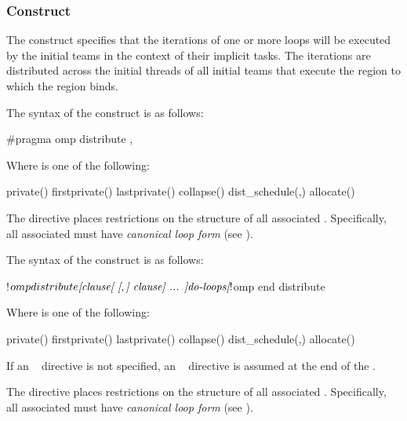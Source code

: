 \subsubsection{ Construct}
\label{subsec:distribute Construct}
\summary
The  construct specifies that the iterations of one or 
more loops will be executed by the initial teams in the context of their 
implicit tasks. The iterations are distributed across the initial threads 
of all initial teams that execute the  region to which the 
 region binds.

\syntax
\begin{ccppspecific}
The syntax of the  construct is as follows:

\begin{ompcPragma}
#pragma omp distribute \plc{[clause[ [},\plc{] clause] ... ] new-line}
\end{ompcPragma}

Where  is one of the following:

\begin{indentedcodelist}
private()
firstprivate()
lastprivate()
collapse()
dist_schedule(\plc{kind[},\plc{ chunk_size]})
allocate(\plc{[allocator :]})
\end{indentedcodelist}

The  directive places restrictions on the structure of all
associated .  Specifically, all associated  must
have \emph{canonical loop form} (see ).
\end{ccppspecific}


\begin{fortranspecific}
The syntax of the  construct is as follows:

\begin{ompfPragma}
!$omp distribute \plc{[clause[ [},\plc{] clause] ... ]}
   \plc{do-loops}
\plc{[}!$omp end distribute\plc{]}
\end{ompfPragma}

Where  is one of the following:

\begin{indentedcodelist}
private()
firstprivate()
lastprivate()
collapse()
dist_schedule(\plc{kind[},\plc{ chunk_size]})
allocate(\plc{[allocator :]})
\end{indentedcodelist}

If an ~ directive is not specified, an 
~ directive is assumed at the end of the .

The  directive places restrictions on the structure of all
associated .  Specifically, all associated  must
have \emph{canonical loop form} (see ).
\end{fortranspecific}

